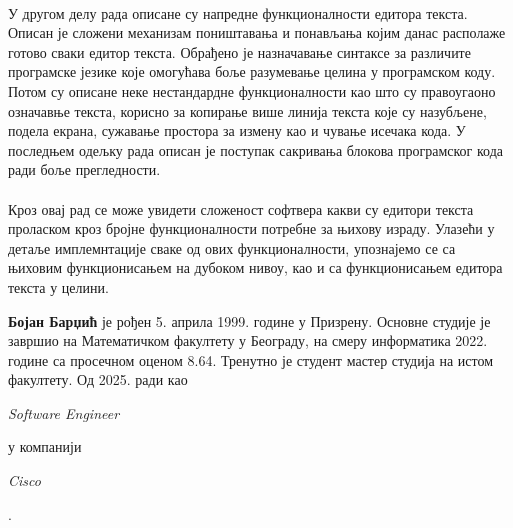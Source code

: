 \documentclass[12pt,oneside]{memoir}
\begin{document}
\paragraph{}
У другом делу рада описане су напредне функционалности едитора текста. Описан је сложени механизам поништавања и понављања којим данас располаже готово сваки едитор текста. Обрађено је назначавање синтаксе за различите
програмске језике које омогућава боље разумевање целина у програмском
коду. Потом су описане неке нестандардне функционалности као што су
правоугаоно означавње текста, корисно за копирање више линија текста које су назубљене, подела екрана, сужавање простора за измену као и
чување исечака кода. У последњем одељку рада описан је поступак сакривања
блокова програмског кода ради боље прегледности.

\paragraph{}
Кроз овај рад се може увидети сложеност софтвера какви су едитори текста
проласком кроз бројне функционалности потребне за њихову израду. Улазећи у детаље имплемнтације сваке од ових функционалности, упознајемо се са њиховим функционисањем на дубоком нивоу, као и са функционисањем едитора текста у целини.
\literatura

\backmatter

\begin{biografija}
\textbf{Бојан Барџић} је рођен 5. априла 1999. године у Призрену. Основне студије
је завршио на Математичком факултету у Београду, на смеру информатика 2022. године
са просечном оценом 8.64. Тренутно је студент мастер студија на истом факултету. Од 2025. ради као \begin{latinica}\textit{Software Engineer}\end{latinica} у компанији \begin{latinica}\textit{Cisco}\end{latinica}.

\end{biografija}
\end{document}
